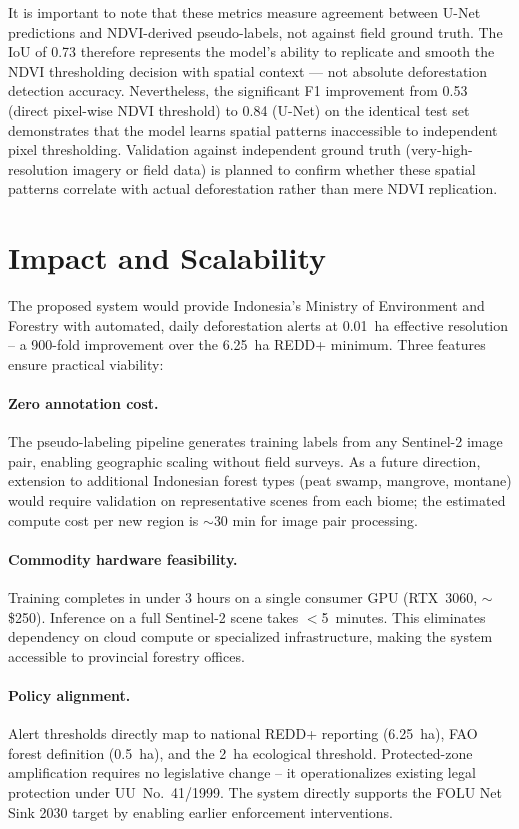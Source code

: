 \documentclass[10pt,a4paper,twocolumn]{article}
\begin{document}
It is important to note that these metrics measure agreement
between U-Net predictions and NDVI-derived pseudo-labels, not
against field ground truth. The IoU of 0.73 therefore represents
the model's ability to replicate and smooth the NDVI thresholding
decision with spatial context --- not absolute deforestation
detection accuracy. Nevertheless, the significant F1 improvement
from 0.53 (direct pixel-wise NDVI threshold) to 0.84 (U-Net) on
the identical test set demonstrates that the model learns spatial
patterns inaccessible to independent pixel thresholding.
Validation against independent ground truth (very-high-resolution
imagery or field data) is planned to confirm whether these spatial
patterns correlate with actual deforestation rather than mere NDVI
replication.

\section{Impact and Scalability}
The proposed system would provide Indonesia's Ministry of
Environment and Forestry with automated, daily deforestation alerts
at 0.01~ha effective resolution -- a 900-fold improvement over the
6.25~ha REDD+ minimum. Three features ensure practical viability:

\paragraph{Zero annotation cost.}
The pseudo-labeling pipeline generates training labels from any
Sentinel-2 image pair, enabling geographic scaling without field
surveys. As a future direction, extension to additional Indonesian
forest types (peat swamp, mangrove, montane) would require
validation on representative scenes from each biome; the estimated
compute cost per new region is $\sim$30 min for image pair
processing.

\paragraph{Commodity hardware feasibility.}
Training completes in under 3 hours on a single consumer GPU
(RTX~3060, $\sim$\$250). Inference on a full Sentinel-2 scene takes
${<}$5~minutes. This eliminates dependency on cloud compute or
specialized infrastructure, making the system accessible to
provincial forestry offices.

\paragraph{Policy alignment.}
Alert thresholds directly map to national REDD+ reporting (6.25~ha),
FAO forest definition (0.5~ha), and the 2~ha ecological threshold.
Protected-zone amplification requires no legislative change --
it operationalizes existing legal protection under UU~No.~41/1999.
The system directly supports the FOLU Net Sink 2030 target by
enabling earlier enforcement interventions.
\end{document}
